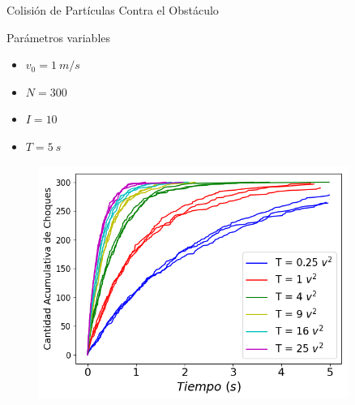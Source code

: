 \begin{frame}{Colisión de Partículas Contra el Obstáculo}
    \begin{minipage}{0.25\textwidth}
        \begin{block}{Parámetros variables}
            \begin{itemize}
                \item $v_0 = 1\ m/s$
                \item $N = 300$
                \item $I = 10$
                \item $T = 5\ s$
            \end{itemize}
        \end{block}
    \end{minipage}
    \hfill
    \begin{minipage}{0.7\textwidth} %
        \begin{figure}[H]
            \centering
            \includegraphics[width=0.9\textwidth]{pic/ejer3/a3Tiradas}
            \label{fig:ejer3:atiradas}
        \end{figure}
    \end{minipage}
\end{frame}

